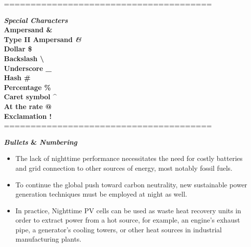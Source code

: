 \documentclass{article}
\begin{document}
	\normalsize
	=======================================								
	
	\vspace{1cm}
	\textbf{\Large{\textit{Special Characters}}}\\
	
	\textbf{Ampersand \&}\\
	
	\textbf{Type II Ampersand \textit{\&}}\\
	
	\textbf{Dollar \$}\\
	
	\textbf{Backslash \textbackslash}\\
	
	\textbf{Underscore \_}\\
	
	\textbf{Hash \#}\\
	
	\textbf{Percentage \%}\\
	
	\textbf{Caret symbol \^}\\
	
	\textbf{At the rate @}\\		%
	
	\textbf{Exclamation !}\\		%
	=======================================								
	
	\textbf{\Large{\textit{Bullets} \& \textit{Numbering}}}\\
	
	\begin{itemize}
		\item The lack of nighttime performance necessitates the need for costly batteries and grid connection to other sources of energy, most notably fossil fuels.
		\item To continue the global push toward carbon neutrality, new sustainable power generation techniques must be employed at night as well.

		\item In practice, Nighttime PV cells can be used as waste heat recovery units in order to extract power from a hot source, for example, an engine’s exhaust pipe, a generator’s cooling towers, or other heat sources in industrial manufacturing plants.

	\end{itemize}
\end{document}
